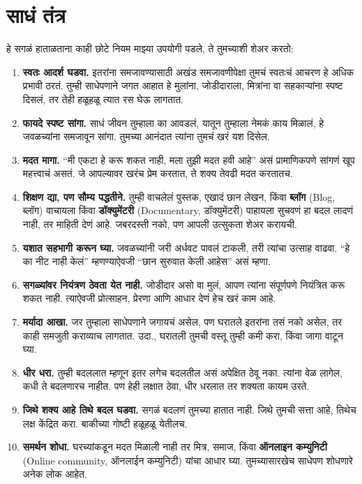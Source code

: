 \section*{साधं तंत्र}
हे सगळं हाताळताना काही छोटे नियम माझ्या उपयोगी पडले, ते तुमच्याशी शेअर करतो:
\begin{enumerate}

 \item \textbf{स्वतः आदर्श घडवा.} इतरांना समजावण्यासाठी अखंड समजावणीपेक्षा तुमचं स्वतःचं आचरण हे अधिक प्रभावी ठरतं. तुम्ही साधेपणाने जगत आहात हे मुलांना, जोडीदाराला, मित्रांना वा सहकाऱ्यांना स्पष्ट दिसलं,
 तर तेही हळूहळू त्यात रस घेऊ लागतात.
 \item  \textbf{फायदे स्पष्ट सांगा.} साधं जीवन तुम्हाला का आवडलं, यातून तुम्हाला नेमकं काय मिळालं,
 हे जवळच्यांना समजावून सांगा. तुमच्या आनंदात त्यांना तुमचं खरं यश दिसेल.
 \item  \textbf{मदत मागा.} ``मी एकटा हे करू शकत नाही, मला तुझी मदत हवी आहे'' असं प्रामाणिकपणे सांगणं खूप महत्त्वाचं असतं. जे आपल्यावर खरंच प्रेम करतात, ते शक्य तेवढी मदत करतातच.
 \item  \textbf{शिक्षण द्या, पण सौम्य पद्धतीने.} तुम्ही वाचलेलं पुस्तक, एखादं छान लेखन, किंवा \textbf{ब्लॉग} (Blog,  ब्लॉग) वाचायला किंवा \textbf{डॉक्युमेंटरी} (Documentary,  डॉक्युमेंटरी) पाहायला सुचवणं हा बदल लादणं नाही, तर माहिती देणं आहे. जबरदस्ती नको, पण आपली उत्सुकता शेअर करायची.
 \item   \textbf{यशात सहभागी करून घ्या.} जवळच्यांनी जरी अर्धवट पावलं टाकली, तरी त्यांचा उत्साह वाढवा.
 ``हे का नीट नाही केलं'' म्हणण्याऐवजी ``छान सुरुवात केली आहेस'' असं म्हणा.
 \item  \textbf{सगळ्यांवर नियंत्रण ठेवता येत नाही.} जोडीदार असो वा मुलं, आपण त्यांना संपूर्णपणे नियंत्रित करू शकत नाही. त्याऐवजी प्रोत्साहन, प्रेरणा आणि आधार देणं हेच खरं काम आहे.
 \item   \textbf{मर्यादा आखा.} जर तुम्हाला साधेपणाने जगायचं असेल, पण घरातले इतरांना तसं नको असेल,
 तर काही समजुती कराव्याच लागतात. उदा., घरातली तुमची वस्तू तुम्ही कमी करा, किंवा जागा वाटून घ्या.
 \item   \textbf{धीर धरा.} तुम्ही बदललात म्हणून इतर लगेच बदलतील असं अपेक्षित ठेवू नका. त्यांना वेळ लागेल, कधी ते बदलणारच नाहीत. पण हेही लक्षात ठेवा,  धीर धरलात तर शक्यता कायम उरते.
 \item  \textbf{जिथे शक्य आहे तिथे बदल घडवा.} सगळं बदलणं तुमच्या हातात नाही. जिथे तुमची सत्ता आहे,
 तिथेच लक्ष केंद्रित करा. बाकीच्या गोष्टी हळूहळू येतीलच.
 \item   \textbf{समर्थन शोधा.} घरच्यांकडून मदत मिळाली नाही तर मित्र, समाज, किंवा \textbf{ऑनलाइन कम्युनिटी} (Online community,  ऑनलाईन कम्युनिटी) यांचा आधार घ्या. तुमच्यासारखेच साधेपण शोधणारे अनेक लोक आहेत.
\end{enumerate}
